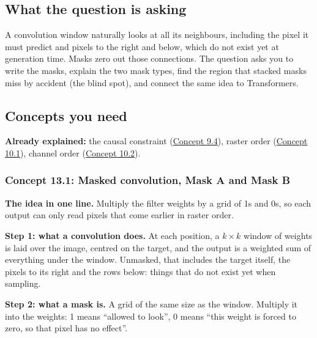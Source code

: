 \documentclass[12pt,a4paper]{article}
\begin{document}
\subsection{What the question is asking}

A convolution window naturally looks at all its neighbours, including the pixel it must predict and pixels to the right and below, which do not exist yet at generation time. Masks zero out those connections. The question asks you to write the masks, explain the two mask types, find the region that stacked masks miss by accident (the blind spot), and connect the same idea to Transformers.

\subsection{Concepts you need}

\textbf{Already explained:} the causal constraint (\hyperref[c9-4]{Concept 9.4}), raster order (\hyperref[c10-1]{Concept 10.1}), channel order (\hyperref[c10-2]{Concept 10.2}).

\subsubsection{Concept 13.1: Masked convolution, Mask A and Mask B}\label{c13-1}

\textbf{The idea in one line.} Multiply the filter weights by a grid of 1s and 0s, so each output can only read pixels that come earlier in raster order.

\textbf{Step 1: what a convolution does.} At each position, a $k\times k$ window of weights is laid over the image, centred on the target, and the output is a weighted sum of everything under the window. Unmasked, that includes the target itself, the pixels to its right and the rows below: things that do not exist yet when sampling.

\textbf{Step 2: what a mask is.} A grid of the same size as the window. Multiply it into the weights: 1 means ``allowed to look'', 0 means ``this weight is forced to zero, so that pixel has no effect''.
\end{document}
